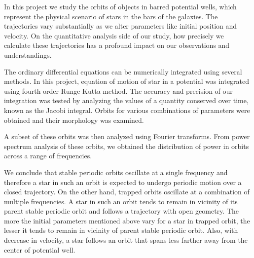 \documentclass[a4paper]{article}
\begin{document}
	In this project we study the orbits of objects in barred potential wells, which represent the physical scenario of stars in the bars of the galaxies. The trajectories vary substantially as we alter parameters like initial position and velocity. On the quantitative analysis side of our study, how precisely we calculate these trajectories has a profound impact on our observations and understandings.
	
	The ordinary differential equations can be numerically integrated using several methods. In this project, equation of motion of star in a potential was integrated using fourth order Runge-Kutta method. The accuracy and precision of our integration was tested by analyzing the values of a quantity conserved over time, known as the Jacobi integral. Orbits for various combinations of parameters were obtained and their morphology was examined. 
	
	A subset of these orbits was then analyzed using Fourier transforms. From power spectrum analysis of these orbits, we obtained the distribution of power in orbits across a range of frequencies.
	
	We conclude that stable periodic orbits oscillate at a single frequency and therefore a star in such an orbit is expected to undergo periodic motion over a closed trajectory. On the other hand, trapped orbits oscillate at a combination of multiple frequencies. A star in such an orbit tends to remain in vicinity of its parent stable periodic orbit and follows a trajectory with open geometry. The more the initial parameters mentioned above vary for a star in trapped orbit, the lesser it tends to remain in vicinity of parent stable periodic orbit. Also, with decrease in velocity, a star follows an orbit that spans less farther away from the center of potential well.  
	
	
	
	\printbibliography[heading=bibintoc]
	
\end{document}

